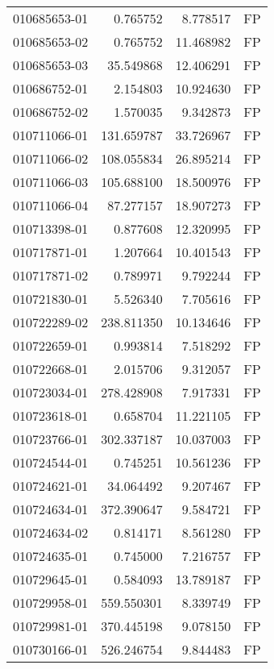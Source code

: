 \begin{tabular}{lrrl}
010685653-01 &    0.765752 &       8.778517 &   FP \\
010685653-02 &    0.765752 &      11.468982 &   FP \\
010685653-03 &   35.549868 &      12.406291 &   FP \\
010686752-01 &    2.154803 &      10.924630 &   FP \\
010686752-02 &    1.570035 &       9.342873 &   FP \\
010711066-01 &  131.659787 &      33.726967 &   FP \\
010711066-02 &  108.055834 &      26.895214 &   FP \\
010711066-03 &  105.688100 &      18.500976 &   FP \\
010711066-04 &   87.277157 &      18.907273 &   FP \\
010713398-01 &    0.877608 &      12.320995 &   FP \\
010717871-01 &    1.207664 &      10.401543 &   FP \\
010717871-02 &    0.789971 &       9.792244 &   FP \\
010721830-01 &    5.526340 &       7.705616 &   FP \\
010722289-02 &  238.811350 &      10.134646 &   FP \\
010722659-01 &    0.993814 &       7.518292 &   FP \\
010722668-01 &    2.015706 &       9.312057 &   FP \\
010723034-01 &  278.428908 &       7.917331 &   FP \\
010723618-01 &    0.658704 &      11.221105 &   FP \\
010723766-01 &  302.337187 &      10.037003 &   FP \\
010724544-01 &    0.745251 &      10.561236 &   FP \\
010724621-01 &   34.064492 &       9.207467 &   FP \\
010724634-01 &  372.390647 &       9.584721 &   FP \\
010724634-02 &    0.814171 &       8.561280 &   FP \\
010724635-01 &    0.745000 &       7.216757 &   FP \\
010729645-01 &    0.584093 &      13.789187 &   FP \\
010729958-01 &  559.550301 &       8.339749 &   FP \\
010729981-01 &  370.445198 &       9.078150 &   FP \\
010730166-01 &  526.246754 &       9.844483 &   FP \\

\end{tabular}
